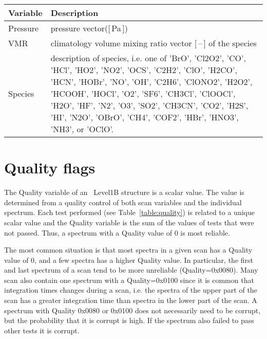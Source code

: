 \begin{table}
\caption{ \smr\ \textit{a priori} data format. 
Example URL: \url{http://malachite.rss.chalmers.se/rest_api/v4/apriori/O3/2015-01-03/AC1/2/7002887494/} }
\label{table:aprioridataformat}
\begin{longtable}{| p{} | p{} |}
\hline
  \textbf{Variable} & \textbf{Description} \\ \hline
    Pressure        & pressure vector([\,Pa\,]) \\ \hline
    VMR             & climatology volume mixing ratio vector [\,--\,] of the species\\ \hline
    Species         & description of species, i.e. one of 'BrO', 'Cl2O2', 'CO', 'HCl', 'HO2', 'NO2',
                      'OCS', 'C2H2', 'ClO', 'H2CO', 'HCN', 'HOBr', 'NO', 'OH', 'C2H6', 'ClONO2', 'H2O2',
                      'HCOOH', 'HOCl', 'O2', 'SF6', 'CH3Cl', 'ClOOCl', 'H2O', 'HF', 'N2', 'O3', 'SO2',
                      'CH3CN', 'CO2', 'H2S', 'HI', 'N2O', 'OBrO', 'CH4', 'COF2', 'HBr', 'HNO3', 'NH3', or 'OClO'.\\ \hline
\hline
\end{longtable}
\end{table}
\addtocounter{table}{-1}


\section{Quality flags}

The Quality variable of an \smr\ Level1B structure is a scalar value.
The value is determined from a quality control
of both scan variables and the individual spectrum.
Each test performed (see Table~\ref{table:quality}) is related to a unique scalar value
and the Quality variable is the sum of the values of tests 
that were not passed.  
Thus, a spectrum with a Quality value of 0 is most reliable.

The most common situation is that most spectra in a given scan has 
a Quality value of 0, and a few spectra has a higher Quality value.
In particular, the first and last spectrum of a scan tend to be more
unreliable (Quality=0x0080).  
Many scan also contain one spectrum with a Quality=0x0100
since it is common that integration times changes during a scan,
i.e. the spectra of the upper part of the scan has a greater integration 
time than spectra in the lower part of the scan.
A spectrum with Quality 0x0080 or 0x0100 does not necessarily need
to be corrupt, but the probability that it is corrupt is high.  
If the spectrum also failed to pass other tests it is corrupt. 

